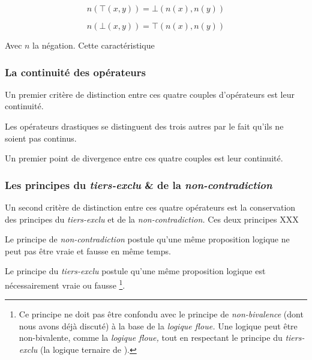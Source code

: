 \begin{equation}
  n\left(⊤(x,y)\right) = ⊥\left(n(x), n(y)\right)
\end{equation}

\begin{equation}
  n\left(⊥(x,y)\right) = ⊤\left(n(x), n(y)\right)
\end{equation}

Avec \(n\) la négation. Cette caractéristique



\subsubsection{La continuité des opérateurs}

Un premier critère de distinction entre ces quatre couples
d'opérateurs est leur continuité.

Les opérateurs drastiques se distinguent des trois autres par le fait
qu'ils ne soient pas continus.


Un premier point de divergence entre ces quatre couples est leur
continuité.



\subsubsection{Les principes du \emph{tiers-exclu} \& de la
  \emph{non-contradiction}}

Un second critère de distinction entre ces quatre opérateurs est la
conservation des principes du \emph{tiers-exclu} et de la
\emph{non-contradiction.} Ces deux principes XXX

Le principe de \emph{non-contradiction} postule qu'une même proposition
logique ne peut pas être vraie et fausse en même temps.


Le principe du \emph{tiers-exclu} postule qu'une même proposition
logique est nécessairement vraie ou fausse \footnote{Ce principe ne
  doit pas être confondu avec le principe de \emph{non-bivalence}
  (dont nous avons déjà discuté) à la base de la \emph{logique floue.}
  Une logique peut être non-bivalente, comme la \emph{logique floue,}
  tout en respectant le principe du \emph{tiers-exclu} (\eg la logique
  ternaire de ).}.






